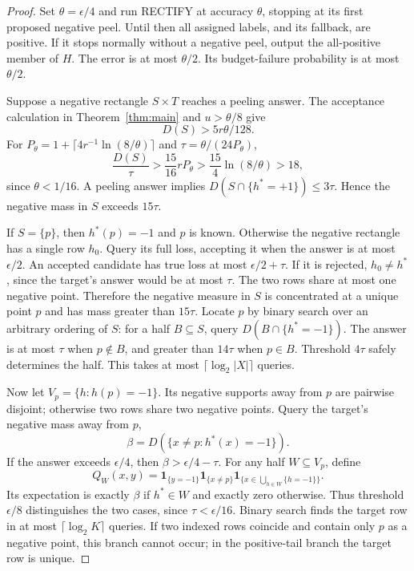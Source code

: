 \documentclass[11pt]{article}
\newcommand{\1}{\mathbf 1}
\begin{document}
\begin{proof}
Set $\theta=\epsilon/4$ and run RECTIFY at accuracy $\theta$, stopping at its first proposed negative peel. Until then all assigned labels, and its fallback, are positive. If it stops normally without a negative peel, output the all-positive member of $H$. The error is at most $\theta/2$. Its budget-failure probability is at most $\theta/2$.

Suppose a negative rectangle $S\times T$ reaches a peeling answer. The acceptance calculation in Theorem~\ref{thm:main} and $u>\theta/8$ give
\[
 D(S)>5r\theta/128.
\]
For $P_\theta=1+\lceil4r^{-1}\ln(8/\theta)\rceil$ and $\tau=\theta/(24P_\theta)$,
\[
 \frac{D(S)}\tau>\frac{15}{16}rP_\theta
 >\frac{15}{4}\ln(8/\theta)>18,
\]
since $\theta<1/16$. A peeling answer implies $D(S\cap\{h^*=+1\})\le3\tau$. Hence the negative mass in $S$ exceeds $15\tau$.

If $S=\{p\}$, then $h^*(p)=-1$ and $p$ is known. Otherwise the negative rectangle has a single row $h_0$. Query its full loss, accepting it when the answer is at most $\epsilon/2$. An accepted candidate has true loss at most $\epsilon/2+\tau$. If it is rejected, $h_0\ne h^*$, since the target's answer would be at most $\tau$. The two rows share at most one negative point. Therefore the negative measure in $S$ is concentrated at a unique point $p$ and has mass greater than $15\tau$. Locate $p$ by binary search over an arbitrary ordering of $S$: for a half $B\subseteq S$, query $D(B\cap\{h^*=-1\})$. The answer is at most $\tau$ when $p\notin B$, and greater than $14\tau$ when $p\in B$. Threshold $4\tau$ safely determines the half. This takes at most $\lceil\log_2|X|\rceil$ queries.

Now let $V_p=\{h:h(p)=-1\}$. Its negative supports away from $p$ are pairwise disjoint; otherwise two rows share two negative points. Query the target's negative mass away from $p$,
\[
 \beta=D(\{x\ne p:h^*(x)=-1\}).
\]
If the answer exceeds $\epsilon/4$, then $\beta>\epsilon/4-\tau$. For any half $W\subseteq V_p$, define
\[
 Q_W(x,y)=\1_{\{y=-1\}}\1_{\{x\ne p\}}
 \1_{\{x\in\bigcup_{h\in W}\{h=-1\}\}}.
\]
Its expectation is exactly $\beta$ if $h^*\in W$ and exactly zero otherwise. Thus threshold $\epsilon/8$ distinguishes the two cases, since $\tau<\epsilon/16$. Binary search finds the target row in at most $\lceil\log_2K\rceil$ queries. If two indexed rows coincide and contain only $p$ as a negative point, this branch cannot occur; in the positive-tail branch the target row is unique.


\end{proof}
\end{document}

